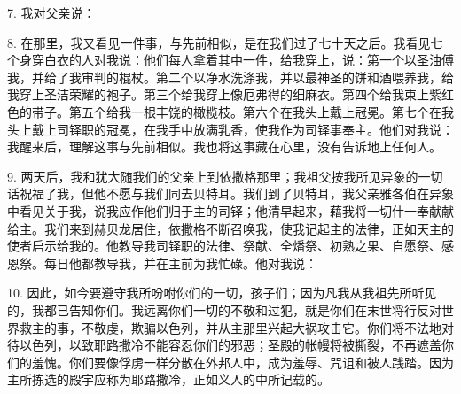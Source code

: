7. 我对父亲说：\par

8. 在那里，我又看见一件事，与先前相似，是在我们过了七十天之后。我看见七个身穿白衣的人对我说：他们每人拿着其中一件，给我穿上，说：第一个以圣油傅我，并给了我审判的棍杖。第二个以净水洗涤我，并以最神圣的饼和酒喂养我，给我穿上圣洁荣耀的袍子。第三个给我穿上像厄弗得的细麻衣。第四个给我束上紫红色的带子。第五个给我一根丰饶的橄榄枝。第六个在我头上戴上冠冕。第七个在我头上戴上司铎职的冠冕，在我手中放满乳香，使我作为司铎事奉主。他们对我说：我醒来后，理解这事与先前相似。我也将这事藏在心里，没有告诉地上任何人。\par

9. 两天后，我和犹大随我们的父亲上到依撒格那里；我祖父按我所见异象的一切话祝福了我，但他不愿与我们同去贝特耳。我们到了贝特耳，我父亲雅各伯在异象中看见关于我，说我应作他们归于主的司铎；他清早起来，藉我将一切什一奉献献给主。我们来到赫贝龙居住，依撒格不断召唤我，使我记起主的法律，正如天主的使者启示给我的。他教导我司铎职的法律、祭献、全燔祭、初熟之果、自愿祭、感恩祭。每日他都教导我，并在主前为我忙碌。他对我说：\par

10. 因此，如今要遵守我所吩咐你们的一切，孩子们；因为凡我从我祖先所听见的，我都已告知你们。我远离你们一切的不敬和过犯，就是你们在末世将行反对世界救主的事，不敬虔，欺骗以色列，并从主那里兴起大祸攻击它。你们将不法地对待以色列，以致耶路撒冷不能容忍你们的邪恶；圣殿的帐幔将被撕裂，不再遮盖你们的羞愧。你们要像俘虏一样分散在外邦人中，成为羞辱、咒诅和被人践踏。因为主所拣选的殿宇应称为耶路撒冷，正如义人的中所记载的。\par

